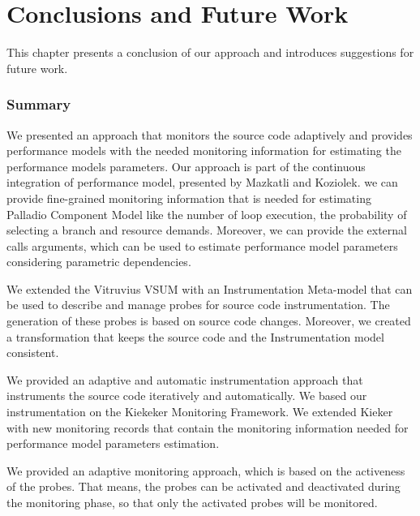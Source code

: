 
\chapter{Conclusions and Future Work}
\label{ch:Conclusions and Future Work}

This chapter presents a conclusion of our approach and introduces suggestions for future work. 

\subsection{Summary}
\label{sec:summary}
We presented an approach that monitors the source code adaptively and provides performance models with the needed monitoring information for estimating the performance models parameters. Our approach is part of the continuous integration of performance model, presented by Mazkatli and Koziolek. we can provide fine-grained monitoring information that is needed for estimating Palladio Component Model like the number of loop execution, the probability of selecting a branch and resource demands. Moreover, we can provide the external calls arguments, which can be used to estimate performance model parameters considering parametric dependencies.

We extended the Vitruvius VSUM with an Instrumentation Meta-model that can be used to describe and manage probes for source code instrumentation. The generation of these probes is based on source code changes. Moreover, we created a transformation that keeps the source code and the Instrumentation model consistent.

We provided an adaptive and automatic instrumentation approach that instruments the source code iteratively and automatically. We based our instrumentation on the Kiekeker Monitoring Framework. We extended Kieker with new monitoring records that contain the monitoring information needed for performance model parameters estimation.  

We provided an adaptive monitoring approach, which is based on the activeness of the probes. That means, the probes can be activated and deactivated during the monitoring phase, so that only the activated probes will be monitored.

